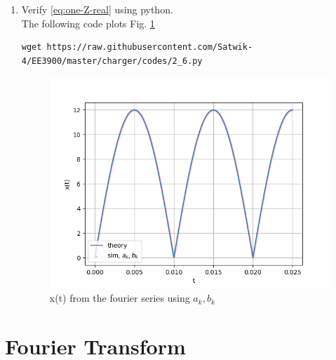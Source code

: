 \documentclass[journal,12pt,twocolumn]{IEEEtran}
\renewcommand\thesection{\arabic{section}}
\begin{document}
\begin{enumerate}[label=\thesection.\arabic*,ref=\thesection.\theenumi]
	
\item Verify 
\eqref{eq:one-Z-real}
using python.
\\\solution The following code plots Fig. \ref{fig:xt-sim-ab}
	\begin{lstlisting}
wget https://raw.githubusercontent.com/Satwik-4/EE3900/master/charger/codes/2_6.py
\end{lstlisting}
	\begin{figure}[h!]
	    \centering
	    \includegraphics[width=\columnwidth]{figures/xt-sim-ab.png}
	    \caption{x(t) from the fourier series using $a_k, b_k$}
	    \label{fig:xt-sim-ab}
	\end{figure}
\end{enumerate}
\section{Fourier Transform}

 
\end{document}

